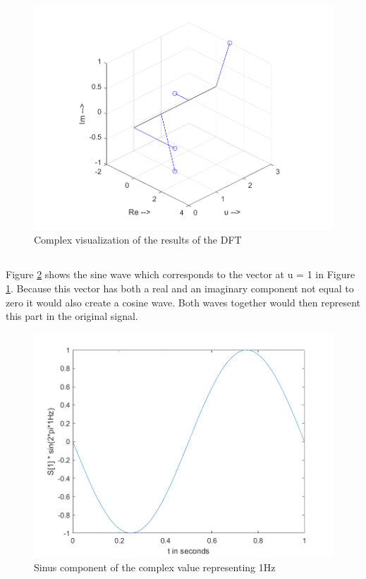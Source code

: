 \documentclass{article}
\begin{document}
\begin{figure}[H]
	\begin{center}
		\includegraphics[width=\textwidth]{./images/Stemcomplex.png}
		\caption{Complex visualization of the results of the DFT} 
    \label{dft}
	\end{center}
\end{figure}

\subsection{}
Figure \ref{sin} shows the sine wave which corresponds to the vector at u = 1 in Figure \ref{dft}. Because this vector has both a real and an imaginary component not equal to zero it would also create a cosine wave. Both waves together would then represent this part in the original signal.
\begin{figure}[H]
	\begin{center}
		\includegraphics[width=\textwidth]{./images/Sinus.png}
		\caption{Sinus component of the complex value representing 1Hz} 
    \label{sin}
	\end{center}
\end{figure}
\end{document}
